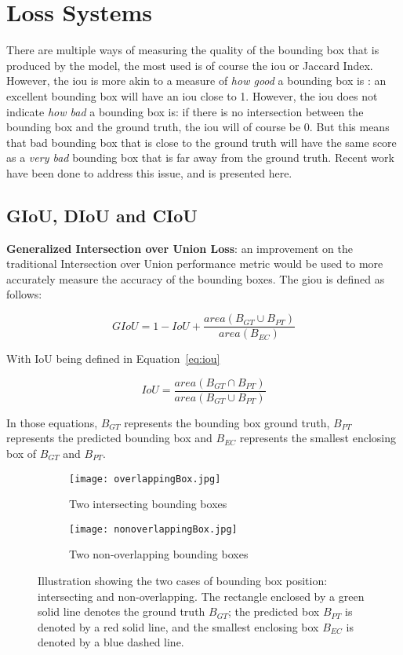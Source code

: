 \section{Loss Systems}
There are multiple ways of measuring the quality of the bounding box that is produced by the model, the most used is of course the \gls{iou} or Jaccard Index. However, the \gls{iou} is more akin to a measure of \textit{how good} a bounding box is : an excellent bounding box will have an \gls{iou} close to 1. However, the \gls{iou} does not indicate \textit{how bad} a bounding box is: if there is no intersection between the bounding box and the ground truth, the \gls{iou} will of course be 0. But this means that bad bounding box that is close to the ground truth will have the same score as a \textit{very bad} bounding box that is far away from the ground truth. Recent work have been done to address this issue, and is presented here.

\subsection{GIoU, DIoU and CIoU}\label{ious}
\textbf{Generalized Intersection over Union Loss}: an improvement on the traditional Intersection over Union performance metric would be used to more accurately measure the accuracy of the bounding boxes. The \gls{giou} is defined as follows:

\begin{equation}
	GIoU = 1 -  IoU + \frac{area(B_{GT} \cup B_{PT})}{area(B_{EC})}
\label{eq:GIoU}
\end{equation}

With IoU being defined in Equation~\ref{eq:iou}

\begin{equation}\label{eq:iou}
	IoU = \frac{area(B_{GT} \cap B_{PT})}{area(B_{GT} \cup B_{PT})}
\end{equation}

In those equations, $B_{GT}$ represents the bounding box ground truth, $B_{PT}$ represents the predicted bounding box and $B_{EC}$ represents the smallest enclosing box of $B_{GT}$ and $B_{PT}$.

\begin{figure}[h!]
\begin{subfigure}{.5\textwidth}
  \centering
  \texttt{[image: overlappingBox.jpg]}  
  \caption{Two intersecting bounding boxes}
  \label{fig:sub-first}
\end{subfigure}
\begin{subfigure}{.5\textwidth}
  \centering
  \texttt{[image: nonoverlappingBox.jpg]}  
  \caption{Two non-overlapping bounding boxes}
  \label{fig:sub-second}
\end{subfigure}
	\caption[Bounding boxes overlap cases]{Illustration showing the two cases of bounding box position: intersecting and non-overlapping. The rectangle enclosed by a green solid line denotes the ground truth $B_{GT}$; the predicted box $B_{PT}$ is denoted by a red solid line, and the smallest enclosing box $B_{EC}$ is denoted by a blue dashed line.}
\label{fig:giou}
\end{figure}


